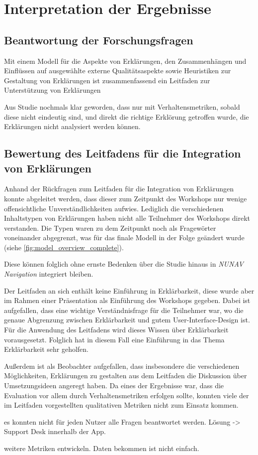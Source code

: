 \section{Interpretation der Ergebnisse}

\subsection*{Beantwortung der Forschungsfragen}

Mit einem Modell für die Aspekte von Erklärungen, den Zusammenhängen und Einflüssen auf ausgewählte externe Qualitätsaspekte sowie Heuristiken zur Gestaltung von Erklärungen ist zusammenfassend ein Leitfaden zur Unterstützung von Erklärungen

Aus Studie nochmals klar geworden, dass nur mit Verhaltensmetriken, sobald diese nicht eindeutig sind, und direkt die \glqq richtige\grqq{} Erklörung getroffen wurde, die Erklärungen nicht analysiert werden können.

\subsection*{Bewertung des Leitfadens für die Integration von Erklärungen}

Anhand der Rückfragen zum Leitfaden für die Integration von Erklärungen konnte abgeleitet werden, dass dieser zum Zeitpunkt des Workshops nur wenige offensichtliche Unverständlichkeiten aufwies. Lediglich die verschiedenen Inhaltstypen von Erklärungen haben nicht alle Teilnehmer des Workshops direkt verstanden. Die Typen waren zu dem Zeitpunkt noch als Fragewörter voneinander abgegrenzt, was für das finale Modell in der Folge geändert wurde (siehe \autoref{fig:model_overview_complete}).

Diese können folglich ohne ernste Bedenken über die Studie hinaus in \textit{NUNAV Navigation} integriert bleiben.

Der Leitfaden an sich enthält keine Einführung in Erklärbarkeit, diese wurde aber im Rahmen einer Präsentation als Einführung des Workshops gegeben. Dabei ist aufgefallen, dass eine wichtige Verständnisfrage für die Teilnehmer war, wo die genaue Abgrenzung zwischen Erklärbarkeit und gutem User-Interface-Design ist. Für die Anwendung des Leitfadens wird dieses Wissen über Erklärbarkeit vorausgesetzt. Folglich hat in diesem Fall eine Einführung in das Thema Erklärbarkeit sehr geholfen.

Außerdem ist als Beobachter aufgefallen, dass insbesondere die verschiedenen Möglichkeiten, Erklärungen zu gestalten aus dem Leitfaden die Diskussion über Umsetzungsideen angeregt haben. Da eines der Ergebnisse war, dass die Evaluation vor allem durch Verhaltensmetriken erfolgen sollte, konnten viele der im Leitfaden vorgestellten qualitativen Metriken nicht zum Einsatz kommen.

es konnten nicht für jeden Nutzer alle Fragen beantwortet werden. Lösung -> Support Desk innerhalb der App.

weitere Metriken entwickeln. Daten bekommen ist nicht einfach.